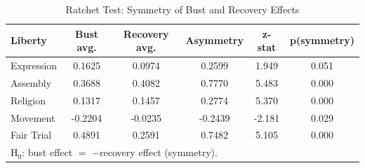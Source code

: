 \begin{table}[htbp]
\centering
\caption{Ratchet Test: Symmetry of Bust and Recovery Effects}
\label{tab:symmetry}
\begin{tabular}{lccccc}
\toprule
Liberty & Bust avg. & Recovery avg. & Asymmetry & z-stat & p(symmetry) \\
\midrule
  Expression & 0.1625 & 0.0974 & 0.2599 & 1.949 & 0.051 \\
  Assembly & 0.3688 & 0.4082 & 0.7770 & 5.483 & 0.000 \\
  Religion & 0.1317 & 0.1457 & 0.2774 & 5.370 & 0.000 \\
  Movement & -0.2204 & -0.0235 & -0.2439 & -2.181 & 0.029 \\
  Fair Trial & 0.4891 & 0.2591 & 0.7482 & 5.105 & 0.000 \\
\midrule
\multicolumn{6}{l}{\footnotesize H$_0$: bust effect $=$ $-$recovery effect (symmetry).} \\
\bottomrule
\end{tabular}
\end{table}